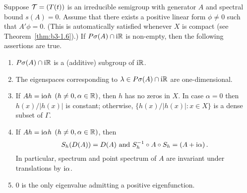 \begin{theorem}\label{thm:b3-3.6}
%
	Suppose $\mathcal{T} = (T(t))$ is an irreducible semigroup with generator $A$ and spectral bound $s(A) = 0$.
	Assume that there exists a positive linear form $\phi \neq 0$ such that $A'\phi = 0$. 
    (This is automatically satisfied whenever $X$ is compact (see Theorem~\ref{thm:b3-1.6}).)
	If $P\sigma(A)\cap \mathrm{i}\mathbb{R}$ is non-empty, then the following assertions are true.
	\begin{enumerate}[\upshape (i)]
		\item 
		$P\sigma(A)\cap \mathrm{i}\mathbb{R}$ is a (additive) subgroup of $\mathrm{i} \mathbb{R}$.
	
		\item 
		The eigenspaces corresponding to $\lambda \in P\sigma(A)\cap \mathrm{i}\mathbb{R}$ are one-dimensional.
	
		\item 
		If $Ah = \mathrm{i}\alpha h$ $(h \neq 0, \alpha \in \mathbb{R})$, then $h$ has no zeros in $X$.
		In case $\alpha = 0$ then $h(x)/|h(x)|$ is constant; otherwise, $\{h(x)/|h(x)| : x \in X\}$ is a dense subset of $\Gamma$.
	
		\item 
		If $Ah = \mathrm{i}\alpha h$ $(h \neq 0, \alpha \in \mathbb{R})$, then
		\begin{equation}\label{eq:b3-3.5}
			S_{h}(D(A)) = D(A) \text{ and } S_{h}^{-1}\circ A \circ S_{h} = (A + \mathrm{i}\alpha)\,.
		\end{equation}
		In particular, spectrum and point spectrum of $A$ are invariant under translations by $\mathrm{i} \alpha$.
	
		\item 
		$0$ is the only eigenvalue admitting a positive eigenfunction.
	\end{enumerate}
\end{theorem}
